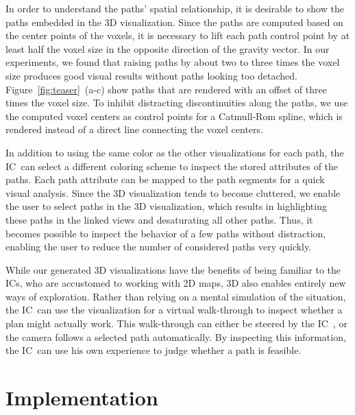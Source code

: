 \documentclass[review,journal]{vgtc}         %
\def\IC{IC}
\begin{document}
 In order to understand the paths' spatial relationship, it is desirable to show the paths embedded in the 3D visualization. Since the paths are computed based on the center points of the voxels, it is necessary to lift each path control point by at least half the voxel size in the opposite direction of the gravity vector. In our experiments, we found that raising paths by about two to three times the voxel size produces good visual results without paths looking too detached. Figure~\ref{fig:teaser}~(a-c) show paths that are rendered with an offset of three times the voxel size. To inhibit distracting discontinuities along the paths, we use the computed voxel centers as control points for a Catmull-Rom spline, which is rendered instead of a direct line connecting the voxel centers. 

In addition to using the same color as the other visualizations for each path, the \IC\ can select a different coloring scheme to inspect the stored attributes of the paths. Each path attribute can be mapped to the path segments for a quick visual analysis. Since the 3D visualization tends to become cluttered, we enable the user to select paths in the 3D visualization, which results in highlighting these paths in the linked views and desaturating all other paths. Thus, it becomes possible to inspect the behavior of a few paths without distraction, enabling the user to reduce the number of considered paths very quickly.

While our generated 3D visualizations have the benefits of being familiar to the \IC s, who are accustomed to working with 2D maps, 3D also enables entirely new ways of exploration. Rather than relying on a mental simulation of the situation, the \IC\ can use the visualization for a virtual walk-through to inspect whether a plan might actually work. This walk-through can either be steered by the \IC\ , or the camera follows a selected path automatically. By inspecting this information, the \IC\ can use his own experience to judge whether a path is feasible.


\section{Implementation} \label{sec:implementation}
\end{document}

